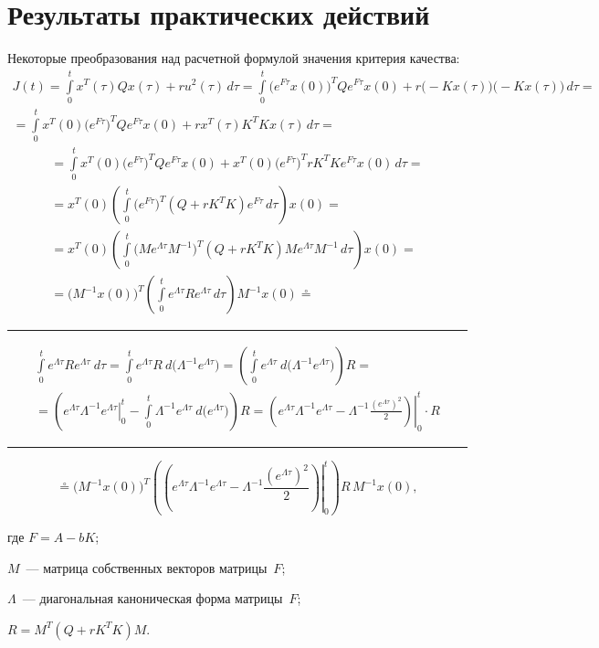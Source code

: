 \vspace{0.3cm}
\section{Результаты практических действий}
Некоторые преобразования над расчетной формулой значения критерия качества:
\begin{gather*}
    J(t) = \int\limits_0^t x^T(\tau) Q x(\tau) + r u^2(\tau) \,d\tau = \int\limits_0^t \bigl( e^{F \tau} x(0) \bigr)^T Q e^{F \tau} x(0) + r \bigl( -K x(\tau) \bigr) \bigl( -K x(\tau) \bigr) \,d\tau = {}
    \\
    {} = \int\limits_0^t x^T(0) \bigl( e^{F \tau} \bigr)^T Q e^{F \tau} x(0) + r x^T(\tau) K^T K x(\tau) \,d\tau = {}
\end{gather*}
\begin{gather*}
    {} = \int\limits_0^t x^T(0) \bigl( e^{F \tau} \bigr)^T Q e^{F \tau} x(0) + x^T(0) \bigl( e^{F\tau} \bigr)^T r K^T K e^{F \tau} x(0) \,d\tau = {}
    \\
    {} = x^T(0) \left( \int\limits_0^t \bigl( e^{F \tau} \bigr)^T ( Q + r K^T K ) e^{F \tau} \,d\tau \right) x(0) = {}
    \\
    {} = x^T(0) \left( \int\limits_0^t \bigl( M e^{\Lambda \tau} M^{-1} \bigr)^T ( Q + r K^T K ) M e^{\Lambda \tau} M^{-1} \,d\tau \right) x(0) = {}
    \\
    {} = \bigl( M^{-1} x(0) \bigr)^T \left( \int\limits_0^t e^{\Lambda \tau} R e^{\Lambda \tau} \,d\tau \right) M^{-1} x(0) \stackrel{\circ}{=} {}
\end{gather*}
\rule{\textwidth}{0.1mm}
\begin{multline*}
   \int\limits_0^t e^{\Lambda \tau} R e^{\Lambda \tau} \:d\tau = \int\limits_0^t e^{\Lambda \tau} R \:d\bigl(\Lambda^{-1}e^{\Lambda \tau}\bigr) = \left( \int\limits_0^t e^{\Lambda \tau} \:d\bigl( \Lambda^{-1} e^{\Lambda \tau} \bigr) \right) \!R = {}
    \\
    = \left( \left. e^{\Lambda \tau} \Lambda^{-1} e^{\Lambda \tau} \right|^t_0 - \int\limits_0^t \Lambda^{-1} e^{\Lambda \tau} \:d\bigl( e^{\Lambda \tau} \bigr) \right) \!R = \left. \left( e^{\Lambda \tau} \Lambda^{-1} e^{\Lambda \tau} - \Lambda^{-1} \frac{(e^{\Lambda \tau})^2}{2} \right)\right|^t_0 \cdot R
\end{multline*}
\rule{\textwidth}{0.1mm}
\begin{equation}
    {} \stackrel{\circ}{=} \bigl( M^{-1} x(0) \bigr)^T \left(  \left. \left( e^{\Lambda \tau} \Lambda^{-1} e^{\Lambda \tau} - \Lambda^{-1} \frac{(e^{\Lambda \tau})^2}{2} \right)\right|^t_0 \right) R\, M^{-1} x(0),
\end{equation}
\begin{ESKDexplanation}
    \item[где ] $F = A - b K$;
    \item $M$~--- матрица собственных векторов матрицы~$F$;
    \item $\Lambda$~--- диагональная каноническая форма матрицы~$F$;
    \item $R = M^T ( Q + r K^T K ) M$.
\end{ESKDexplanation}

